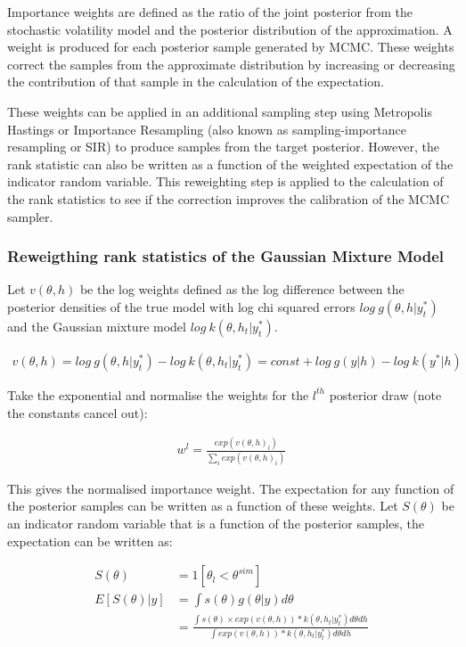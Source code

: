 \documentclass[12pt, a4paper]{article}
\begin{document}
    Importance weights are defined as the ratio of the joint posterior from the stochastic volatility model and the posterior distribution of the approximation. A weight is produced for each posterior sample generated by MCMC. These weights correct the samples from the approximate distribution by increasing or decreasing the contribution of that sample in the calculation of the expectation. 

    These weights can be applied in an additional sampling step using Metropolis Hastings or Importance Resampling (also known as sampling-importance resampling or SIR) to produce samples from the target posterior. However, the rank statistic can also be written as a function of the weighted expectation of the indicator random variable. This reweighting step is applied to the calculation of the rank statistics to see if the correction improves the calibration of the MCMC sampler.

    \subsubsection{Reweigthing rank statistics of the Gaussian Mixture Model}
    Let $v(\theta, h)$ be the log weights defined as the log difference between the posterior densities of the true model with log chi squared errors $log\: g(\theta, h | y^{\ast}_t)$ and the Gaussian mixture model $log\:  k(\theta, h_t | y^{\ast}_t)$.

    $$
    \begin{aligned}
        v(\theta, h) = log\: g(\theta, h | y^{\ast}_t) - log\:  k(\theta, h_t | y^{\ast}_t) = const + log\: g(y|h) - log\: k(y^{\ast} | h)
    \end{aligned}
    $$

    Take the exponential and normalise the weights for the $l^{th}$ posterior draw (note the constants cancel out):
    
    $$
    \begin{aligned}
    w^l = \frac{exp(v(\theta, h)_l)}{\sum_i exp(v(\theta, h)_i)}
    \end{aligned}
    $$

    This gives the normalised importance weight. The expectation for any function of the posterior samples can be written as a function of these weights. Let $S(\theta)$ be an indicator random variable that is a function of the posterior samples, the expectation can be written as:

    $$
    \begin{aligned}
    S(\theta) &= 1[\theta_l < \theta^{sim}] \\
    E[S(\theta) | y] &= \int s(\theta) g(\theta | y) d\theta\\ 
    &= \frac{\int s(\theta)\times exp(v(\theta, h)) * k(\theta, h_t | y^{\ast}_t)d\theta d h}{\int exp(v(\theta, h)) * k(\theta, h_t | y^{\ast}_t)d\theta d h} 
    \end{aligned}
    $$
\end{document}
